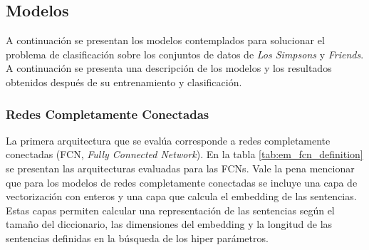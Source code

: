 \subsection{Modelos}
A continuación se presentan los modelos contemplados para solucionar el problema de clasificación sobre los conjuntos de datos de \textit{Los Simpsons} y \textit{Friends}. A continuación se presenta una descripción de los modelos y los resultados obtenidos después de su entrenamiento y clasificación.

\subsubsection{Redes Completamente Conectadas}
La primera arquitectura que se evalúa corresponde a redes completamente conectadas (FCN, \textit{Fully Connected Network}). En la tabla \ref{tab:em_fcn_definition} se presentan las arquitecturas evaluadas para las FCNs. Vale la pena mencionar que para los modelos de redes completamente conectadas se incluye una capa de vectorización con enteros y una capa que calcula el embedding de las sentencias. Estas capas permiten calcular una representación de las sentencias según el tamaño del diccionario, las dimensiones del embedding y la longitud de las sentencias definidas en la búsqueda de los hiper parámetros.


